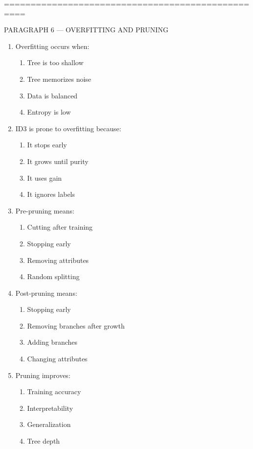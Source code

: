 \documentclass[3pt]{article}
\begin{document}
\vspace{0.3em}

	==================================================
	
	PARAGRAPH 6 — OVERFITTING AND PRUNING
	
	\begin{enumerate}
		\item Overfitting occurs when:
		\begin{enumerate}
			\item Tree is too shallow
			\item Tree memorizes noise
			\item Data is balanced
			\item Entropy is low
		\end{enumerate}
		
		\item ID3 is prone to overfitting because:
		\begin{enumerate}
			\item It stops early
			\item It grows until purity
			\item It uses gain
			\item It ignores labels
		\end{enumerate}
		
		\item Pre-pruning means:
		\begin{enumerate}
			\item Cutting after training
			\item Stopping early
			\item Removing attributes
			\item Random splitting
		\end{enumerate}
		
		\item Post-pruning means:
		\begin{enumerate}
			\item Stopping early
			\item Removing branches after growth
			\item Adding branches
			\item Changing attributes
		\end{enumerate}
		
		\item Pruning improves:
		\begin{enumerate}
			\item Training accuracy
			\item Interpretability
			\item Generalization
			\item Tree depth
		\end{enumerate}
		

\end{enumerate}
\end{document}
